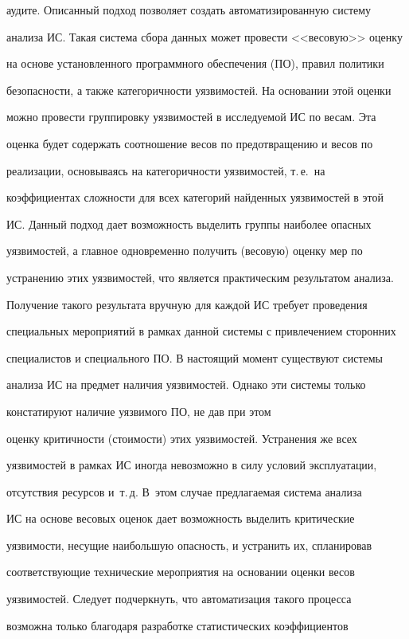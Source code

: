аудите. Описанный подход позволяет создать автоматизированную сис\-те\-му 


анализа ИС. Такая сис\-те\-ма сбора данных может провести <<весовую>> оценку 


на основе установленного программного обеспечения (ПО), правил политики 


безопасности, а также категоричности уязвимостей. На основании этой оценки 


можно провести группировку уязвимостей в исследуемой ИС по весам. Эта 


оценка будет содержать соотношение весов по предотвращению и весов по 


реализации, основываясь на категоричности уязвимостей, т.\,е.\ на 


коэффициентах сложности для всех категорий найденных уязвимостей в этой 


ИС. Данный подход дает возможность выделить группы наиболее опасных 


уязвимостей, а главное одновременно получить (весовую) оценку мер по 


устранению этих уязвимостей, что является практическим результатом анализа. 


Получение такого результата вручную для каждой ИС требует проведения 


специальных мероприятий в рамках данной системы с привлечением сторонних 


специалистов и специального ПО. В настоящий момент существуют системы 


анализа ИС на предмет наличия уязвимостей. Однако эти системы только 


констатируют наличие уязвимого ПО, не дав при этом 


оценку критичности (стоимости) этих уязвимостей. Устранения же всех 


уязвимостей в рамках ИС иногда невозможно в силу условий эксплуатации, 


отсутствия ресурсов и~т.\,д. В~этом случае предлагаемая система анализа 


ИС на основе весовых оценок дает возможность выделить критические 


уязвимости, несущие наибольшую опасность, и устранить их, спланировав 


соответствующие технические мероприятия на основании оценки весов 


уязвимостей. Следует подчеркнуть, что автоматизация такого процесса 


возможна только благодаря разработке статистических коэффициентов 


